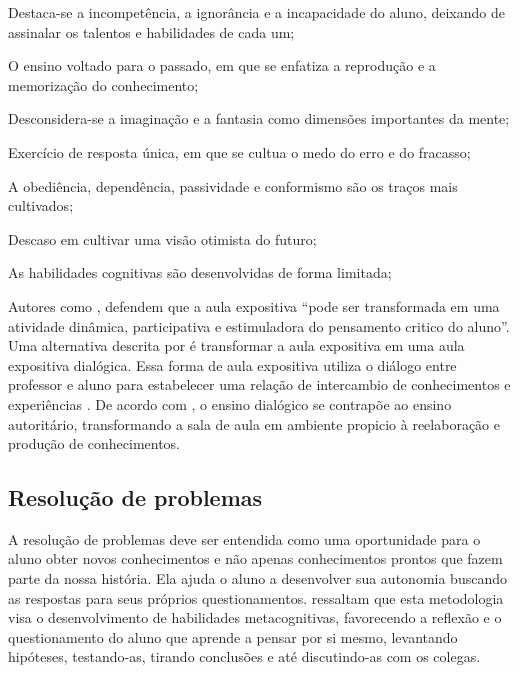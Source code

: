 \begin{alineascomponto}
\item Destaca-se a incompetência, a ignorância e a incapacidade do aluno, deixando de assinalar os talentos e habilidades de cada um; 
\item O ensino voltado para o passado, em que se enfatiza a reprodução e a memorização do conhecimento;
\item Desconsidera-se a imaginação e a fantasia como dimensões importantes da mente;
\item Exercício de resposta única, em que se cultua o medo do erro e do fracasso;
\item A obediência, dependência, passividade e conformismo são os traços mais cultivados;
\item Descaso em cultivar uma visão otimista do futuro;
\item As habilidades cognitivas são desenvolvidas de forma limitada;
\end{alineascomponto}

Autores como , defendem que a aula expositiva ``pode ser transformada em uma atividade dinâmica, participativa e 
estimuladora do pensamento critico do aluno''. Uma alternativa descrita por  é transformar a aula 
expositiva em uma aula expositiva dialógica. Essa forma de aula expositiva utiliza o diálogo entre professor e aluno para estabelecer 
uma relação de intercambio de conhecimentos e experiências \cite{lopes1995aula}. De acordo com , o 
ensino dialógico se contrapõe ao ensino autoritário, transformando  a  sala  de  aula  em  ambiente  propicio  à  reelaboração  e 
produção de conhecimentos.


\subsection{Resolução de problemas}\label{resolucao_problemas}

A resolução de problemas deve ser entendida como uma oportunidade para o aluno obter novos conhecimentos e não apenas 
conhecimentos prontos que fazem parte da nossa história. Ela ajuda o aluno a desenvolver sua autonomia buscando as respostas 
para seus próprios questionamentos.  ressaltam  que esta metodologia visa o desenvolvimento de 
habilidades metacognitivas, favorecendo a reflexão e o questionamento do aluno que aprende a pensar por si mesmo, levantando 
hipóteses, testando-as, tirando conclusões e até discutindo-as com os colegas.

